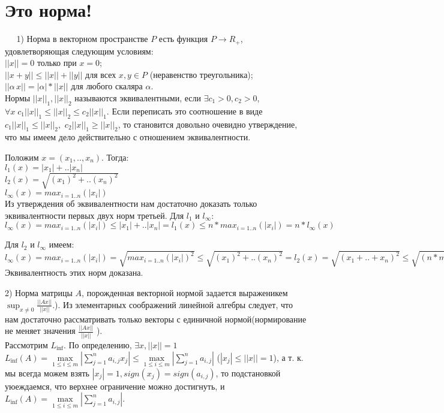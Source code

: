 \documentclass{article}
\begin{document}
\section{Это норма!}

$\; \; \; \; \;$1) Норма в векторном пространстве $P$ есть функция $P \to R_+$, удовлетворяющая следующим условиям: \\
$||x|| = 0$ только при $x = 0$;\\
$||x+y|| \leq ||x||+||y||$ для всех $x, y \in P$ (неравенство треугольника);\\
$||\alpha\, x||=|\alpha|*||x||$ для любого скаляра $\alpha$.\\

Нормы $||x||_1, ||x||_2$ называются эквивалентными, если 
$\exists c_1 > 0, c_2 > 0$, $\forall x \; c_1||x||_1 \leq ||x||_2 \leq c_2||x||_1 $.
Если переписать это соотношение в виде 
$c_1||x||_1 \leq ||x||_2, $
$c_2||x||_1 \geq ||x||_2 $, то становится довольно очевидно утверждение, что мы имеем дело действительно с отношением эквивалентности. 

Положим $x = (x_1, .. , x_n)$. Тогда: \\
$l_1(x) = |x_1| + .. |x_n|$\\
$l_2(x) = \sqrt{(x_1)^2 + .. (x_n)^2}$\\
$l_\infty(x) = max_{i = 1 .. n}(|x_i|)$\\

Из утверждения об эквивалентности нам достаточно доказать только эквивалентности
первых двух норм третьей. Для $l_1$ и $l_\infty$:\\
$l_\infty(x) = max_{i = 1 .. n}(|x_i|) \leq |x_1| + .. |x_n| = l_1(x) \leq
n*max_{i = 1 .. n}(|x_i|) = n*l_\infty(x)$

Для $l_2$ и $l_\infty$ имеем:\\
$l_\infty(x) = max_{i = 1 .. n}(|x_i|) = \sqrt{max_{i = 1 .. n}(|x_i|)^2} \leq 
\sqrt{(x_1)^2 + .. (x_n)^2} = l_2(x) = \sqrt{(x_1 + .. + x_n)^2} \leq 
\sqrt{(n*max_{i = 1 .. n}(|x_i|))^2} = n*max_{i = 1 .. n}(|x_i|) = n*l_\infty(x)$\\
Эквивалентность этих норм доказана.

2) Норма матрицы $A$, порожденная векторной нормой задается выраженикем $\sup_{x \neq 0}\frac{||Ax||}{||x||}$.). Из элементарных соображений линейной алгебры следует, что нам достаточно рассматривать только векторы с единичной нормой(нормирование не меняет значения $\frac{||Ax||}{||x||}$ ).\\ 

Рассмотрим $L_{\inf}$. По определению,  $\exists x, ||x|| = 1$
$L_{\inf}(A) = \max\limits_{1\leq i \leq m } \left| \sum\limits_{j = 1}^{n}a_{i, j}x_j\right|  \leq 
\max\limits_{1\leq i \leq m } \left| \sum\limits_{j = 1}^{n}a_{i, j}\right|$
($ |x_j| \leq ||x|| = 1$), а т. к. мы всегда можем взять $|x_j| = 1, sign(x_j) = sign(a_{i, j})$, то подстановкой уюеждаемся, что верхнее ограничение можно достигнуть, и 
$L_{\inf}(A) = \max\limits_{1\leq i \leq m } \left| \sum\limits_{j = 1}^{n}a_{i, j}\right|$.
\end{document}
